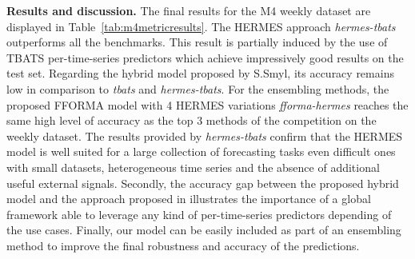 \documentclass[10pt]{article} %
\begin{document}
\textbf{Results and discussion. } The final results for the M4 weekly dataset are displayed in Table~\ref{tab:m4metricresults}. The HERMES approach \textit{hermes-tbats} outperforms all the benchmarks. This result is partially induced by the use of TBATS per-time-series predictors which achieve impressively good results on the test set. Regarding the hybrid model proposed by S.Smyl, its accuracy remains low in comparison to \textit{tbats} and  \textit{hermes-tbats}. For the ensembling methods, the proposed FFORMA model with 4 HERMES variations \textit{fforma-hermes} reaches the same high level of accuracy as the top 3 methods of the competition on the weekly dataset.
The results provided by \textit{hermes-tbats} confirm that the HERMES model is well suited for a large collection of forecasting tasks even difficult ones with small datasets, heterogeneous time series and the absence of  additional useful external signals. Secondly, the accuracy gap between the proposed hybrid model and the approach proposed in \citet{smyl2020} illustrates the importance of a global framework able to leverage any kind of per-time-series predictors depending of the use cases. Finally, our model can be easily included as part of an ensembling method to improve the final robustness and accuracy of the predictions.
\end{document}
